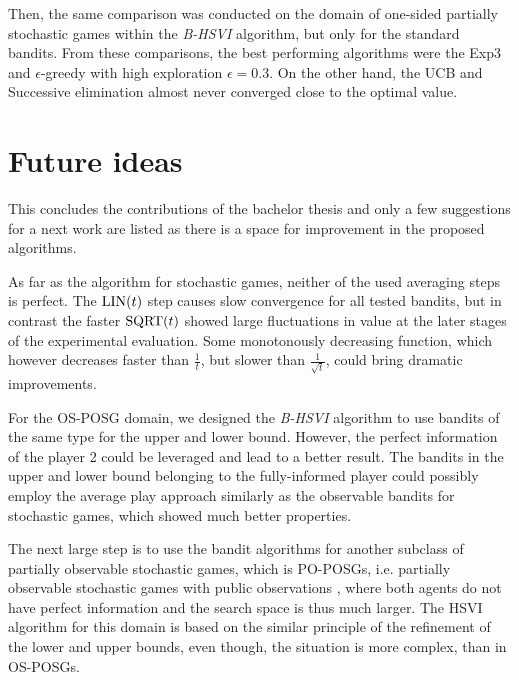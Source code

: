 \documentclass[../main.tex]{subfiles}
\begin{document}
Then, the same comparison was conducted on the domain of one-sided partially stochastic games within the \textit{B-HSVI} algorithm, but only for the standard bandits.
From these comparisons, the best performing algorithms were the Exp3 and $\epsilon$-greedy with high exploration $\epsilon = 0.3$.
On the other hand, the UCB and Successive elimination almost never converged close to the optimal value.

\section{Future ideas}
This concludes the contributions of the bachelor thesis and only a few suggestions for a next work are listed as there is a space for improvement in the proposed algorithms.

As far as the algorithm for stochastic games, neither of the used averaging steps is perfect.
The $\text{LIN}(t)$ step causes slow convergence for all tested bandits, but in contrast the faster $\text{SQRT}(t)$ showed large fluctuations in value at the later stages of the experimental evaluation.
Some monotonously decreasing function, which however decreases faster than $\frac{1}{t}$, but slower than $\frac{1}{\sqrt{t}}$, could bring dramatic improvements.

For the OS-POSG domain, we designed the \textit{B-HSVI} algorithm to use bandits of the same type for the upper and lower bound.
However, the perfect information of the player 2 could be leveraged and lead to a better result.
The bandits in the upper and lower bound belonging to the fully-informed player could possibly employ the average play approach similarly as the observable bandits for stochastic games, which showed much better properties.

The next large step is to use the bandit algorithms for another subclass of partially observable stochastic games, which is PO-POSGs, i.e. partially observable stochastic games with public observations \cite{poposgs}, where both agents do not have perfect information and the search space is thus much larger.
The HSVI algorithm for this domain is based on the similar principle of the refinement of the lower and upper bounds, even though, the situation is more complex, than in OS-POSGs.
\end{document}
